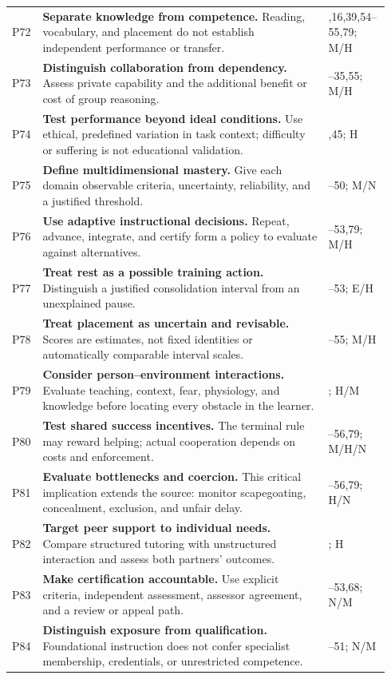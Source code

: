 \begin{longtable}{@{}>{\raggedright\arraybackslash}p{0.055\linewidth}>{\raggedright\arraybackslash}p{0.735\linewidth}>{\raggedright\arraybackslash}p{0.15\linewidth}@{}}
P72 & \textbf{Separate knowledge from competence.} Reading, vocabulary, and placement do not establish independent performance or transfer. & 12,16,39,54--55,79; M/H\\[0.5em]
P73 & \textbf{Distinguish collaboration from dependency.} Assess private capability and the additional benefit or cost of group reasoning. & 34--35,55; M/H\\[0.5em]
P74 & \textbf{Test performance beyond ideal conditions.} Use ethical, predefined variation in task context; difficulty or suffering is not educational validation. & 39,45; H\\[0.5em]
P75 & \textbf{Define multidimensional mastery.} Give each domain observable criteria, uncertainty, reliability, and a justified threshold. & 49--50; M/N\\[0.5em]
P76 & \textbf{Use adaptive instructional decisions.} Repeat, advance, integrate, and certify form a policy to evaluate against alternatives. & 52--53,79; M/H\\[0.5em]
P77 & \textbf{Treat rest as a possible training action.} Distinguish a justified consolidation interval from an unexplained pause. & 52--53; E/H\\[0.5em]
P78 & \textbf{Treat placement as uncertain and revisable.} Scores are estimates, not fixed identities or automatically comparable interval scales. & 54--55; M/H\\[0.5em]
P79 & \textbf{Consider person--environment interactions.} Evaluate teaching, context, fear, physiology, and knowledge before locating every obstacle in the learner. & 56; H/M\\[0.5em]
P80 & \textbf{Test shared success incentives.} The terminal rule may reward helping; actual cooperation depends on costs and enforcement. & 55--56,79; M/H/N\\[0.5em]
P81 & \textbf{Evaluate bottlenecks and coercion.} This critical implication extends the source: monitor scapegoating, concealment, exclusion, and unfair delay. & 55--56,79; H/N\\[0.5em]
P82 & \textbf{Target peer support to individual needs.} Compare structured tutoring with unstructured interaction and assess both partners' outcomes. & 56; H\\[0.5em]
P83 & \textbf{Make certification accountable.} Use explicit criteria, independent assessment, assessor agreement, and a review or appeal path. & 52--53,68; N/M\\[0.5em]
P84 & \textbf{Distinguish exposure from qualification.} Foundational instruction does not confer specialist membership, credentials, or unrestricted competence. & 50--51; N/M\\[0.5em]

\end{longtable}
